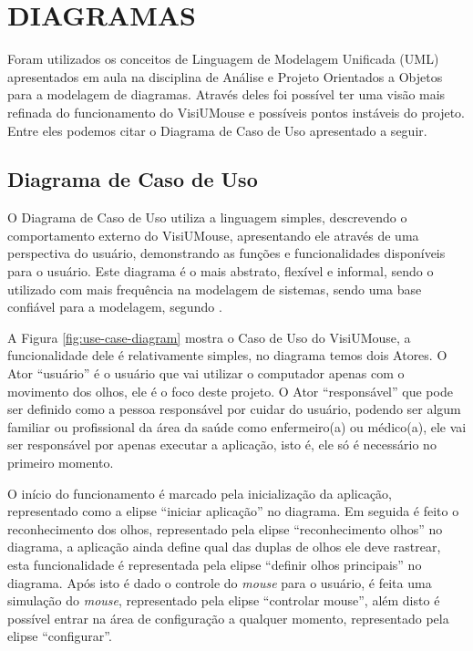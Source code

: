 \section{DIAGRAMAS}\label{Sub:diagramas}
Foram utilizados os conceitos de Linguagem de Modelagem Unificada (UML) apresentados em aula na disciplina de Análise e Projeto Orientados a Objetos para a modelagem de diagramas. Através deles foi possível ter uma visão mais refinada do funcionamento do VisiUMouse e possíveis pontos instáveis do projeto. Entre eles podemos citar o Diagrama de Caso de Uso apresentado a seguir.

\subsection{Diagrama de Caso de Uso}
O Diagrama de Caso de Uso utiliza a linguagem simples, descrevendo o comportamento externo do VisiUMouse, apresentando ele através de uma perspectiva do usuário, demonstrando as funções e funcionalidades disponíveis para o usuário. Este diagrama é o mais abstrato, flexível e informal, sendo o utilizado com mais frequência na modelagem de sistemas, sendo uma base confiável para a modelagem, segundo . 

A Figura \ref{fig:use-case-diagram} mostra o Caso de Uso do VisiUMouse, a funcionalidade dele é relativamente simples, no diagrama temos dois Atores. O Ator “usuário” é o usuário que vai utilizar o computador apenas com o movimento dos olhos, ele é o foco deste projeto. O Ator “responsável” que pode ser definido como a pessoa responsável por cuidar do usuário, podendo ser algum familiar ou profissional da área da saúde como enfermeiro(a) ou médico(a), ele vai ser responsável por apenas executar a aplicação, isto é, ele só é necessário no primeiro momento. 

O início do funcionamento é marcado pela inicialização da aplicação, representado como a elipse “iniciar aplicação” no diagrama. Em seguida é feito o reconhecimento dos olhos, representado pela elipse “reconhecimento olhos” no diagrama, a aplicação ainda define qual das duplas de olhos ele deve rastrear, esta funcionalidade é representada pela elipse “definir olhos principais” no diagrama.  Após isto é dado o controle do \textit{mouse} para o usuário, é feita uma simulação do \textit{mouse}, representado pela elipse “controlar mouse”, além disto é possível entrar na área de configuração a qualquer momento, representado pela elipse “configurar”.

